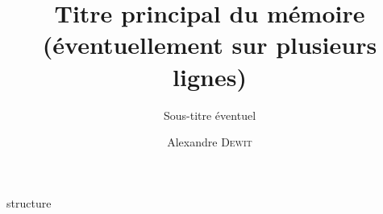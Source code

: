\documentclass{EPL-master-thesis-covers-FR}
\title{Titre principal du mémoire (éventuellement sur plusieurs lignes)}
\subtitle{Sous-titre éventuel}
\author{Alexandre \textsc{Dewit}}
\begin{document}
  \maketitle
  
  {structure}

  \backcoverpage
\end{document}

